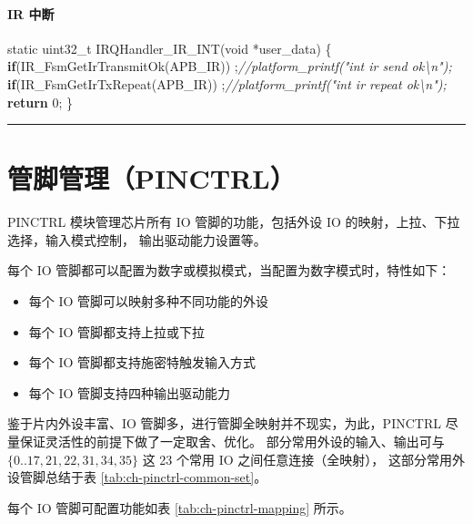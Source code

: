 \documentclass[
  12pt,
]{book}
\newenvironment{Shaded}{\begin{snugshade}}{\end{snugshade}}
\newcommand{\CommentTok}[1]{\textcolor[rgb]{0.56,0.35,0.01}{\textit{#1}}}
\newcommand{\ControlFlowTok}[1]{\textcolor[rgb]{0.13,0.29,0.53}{\textbf{#1}}}
\newcommand{\DataTypeTok}[1]{\textcolor[rgb]{0.13,0.29,0.53}{#1}}
\newcommand{\DecValTok}[1]{\textcolor[rgb]{0.00,0.00,0.81}{#1}}
\newcommand{\NormalTok}[1]{#1}
\providecommand{\tightlist}{%
  \setlength{\itemsep}{0pt}\setlength{\parskip}{0pt}}
\begin{document}
\hypertarget{ir-ux4e2dux65ad}{%
\subsubsection{IR 中断}\label{ir-ux4e2dux65ad}}

\begin{Shaded}
\begin{Highlighting}[]
\DataTypeTok{static} \DataTypeTok{uint32_t}\NormalTok{ IRQHandler_IR_INT(}\DataTypeTok{void}\NormalTok{ *user_data)}
\NormalTok{\{}
    \ControlFlowTok{if}\NormalTok{(IR_FsmGetIrTransmitOk(APB_IR))}
\NormalTok{        ;}\CommentTok{//platform_printf("int ir send ok\textbackslash{}n");}
    \ControlFlowTok{if}\NormalTok{(IR_FsmGetIrTxRepeat(APB_IR))}
\NormalTok{        ;}\CommentTok{//platform_printf("int ir repeat ok\textbackslash{}n");}
    \ControlFlowTok{return} \DecValTok{0}\NormalTok{;}
\NormalTok{\}}
\end{Highlighting}
\end{Shaded}

\begin{center}\rule{0.5\linewidth}{0.5pt}\end{center}

\hypertarget{ch-pinctrl}{%
\chapter{管脚管理（PINCTRL）}\label{ch-pinctrl}}

PINCTRL 模块管理芯片所有 IO 管脚的功能，包括外设 IO 的映射，上拉、下拉选择，输入模式控制，
输出驱动能力设置等。

每个 IO 管脚都可以配置为数字或模拟模式，当配置为数字模式时，特性如下：

\begin{itemize}
\tightlist
\item
  每个 IO 管脚可以映射多种不同功能的外设
\item
  每个 IO 管脚都支持上拉或下拉
\item
  每个 IO 管脚都支持施密特触发输入方式
\item
  每个 IO 管脚支持四种输出驱动能力
\end{itemize}

鉴于片内外设丰富、IO 管脚多，进行管脚全映射并不现实，为此，PINCTRL 尽量保证灵活性的前提下做了一定取舍、优化。
部分常用外设的输入、输出可与 \(\{{0 .. 17, 21, 22, 31, 34, 35\}}\) 这 23 个常用 IO 之间任意连接（全映射），
这部分常用外设管脚总结于表 \ref{tab:ch-pinctrl-common-set}。

每个 IO 管脚可配置功能如表 \ref{tab:ch-pinctrl-mapping} 所示。
\end{document}
